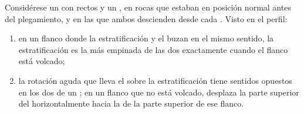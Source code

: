 \begin{proposition}\label{prop:b1:faults-folds-fabrics:cleavage-bedding}
Considérese un  con  rectos y un , en rocas que estaban en posición normal antes del plegamiento,
y en las que ambos  descienden desde cada  . Visto en el perfil:
\begin{enumerate}[label=(\alph*)]
  \item en un flanco donde la estratificación y el  buzan en el mismo sentido, la estratificación es la más empinada de
        las dos exactamente cuando el flanco está volcado;
  \item la rotación aguda que lleva el  sobre la estratificación tiene sentidos opuestos en los dos  de un ;
        en un flanco que no está volcado, desplaza la parte superior del  horizontalmente hacia la   de la
        parte superior de ese flanco.
\end{enumerate}
\end{proposition}

